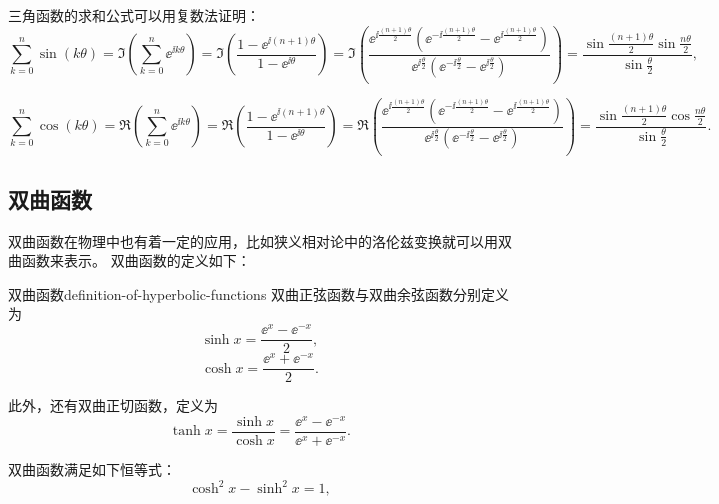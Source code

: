 三角函数的求和公式可以用复数法证明：
\begin{equation}
    \sum_{k=0}^{n} \sin (k \theta)
    = \Im \left( \sum_{k=0}^{n} \ee^{\ii k \theta} \right) = \Im \left( \frac{1 - \ee^{\ii (n+1) \theta}}{1 - \ee^{\ii \theta}} \right)
    = \Im \left( \frac{\ee^{\ii \frac{(n+1) \theta}{2}} \left( \ee^{-\ii \frac{(n+1) \theta}{2}} - \ee^{\ii \frac{(n+1) \theta}{2}} \right)}{\ee^{\ii \frac{\theta}{2}} \left( \ee^{-\ii \frac{\theta}{2}} - \ee^{\ii \frac{\theta}{2}} \right)}\right)
    = \frac{\sin \frac{(n+1) \theta}{2} \sin \frac{n \theta}{2}}{\sin \frac{\theta}{2}} ,
\end{equation}

\begin{equation}
    \sum_{k=0}^{n} \cos (k \theta)
    = \Re \left( \sum_{k=0}^{n} \ee^{\ii k \theta} \right) = \Re \left( \frac{1 - \ee^{\ii (n+1) \theta}}{1 - \ee^{\ii \theta}} \right)
    = \Re \left( \frac{\ee^{\ii \frac{(n+1) \theta}{2}} \left( \ee^{-\ii \frac{(n+1) \theta}{2}} - \ee^{\ii \frac{(n+1) \theta}{2}} \right)}{\ee^{\ii \frac{\theta}{2}} \left( \ee^{-\ii \frac{\theta}{2}} - \ee^{\ii \frac{\theta}{2}} \right)}\right)
    = \frac{\sin \frac{(n+1) \theta}{2} \cos \frac{n \theta}{2}}{\sin \frac{\theta}{2}} .
\end{equation}

\subsection{双曲函数}\label{subsec:hyperbolic-functions}
双曲函数在物理中也有着一定的应用，比如狭义相对论中的洛伦兹变换就可以用双曲函数来表示。
双曲函数的定义如下：
\begin{definition}{双曲函数}{definition-of-hyperbolic-functions}
    双曲正弦函数与双曲余弦函数分别定义为
    \begin{equation}
        \sinh x = \frac{\ee^x - \ee^{-x}}{2} ,
    \end{equation}
    \begin{equation}
        \cosh x = \frac{\ee^x + \ee^{-x}}{2} .
    \end{equation}

    此外，还有双曲正切函数，定义为
    \begin{equation}
        \tanh x = \frac{\sinh x}{\cosh x} = \frac{\ee^x - \ee^{-x}}{\ee^x + \ee^{-x}} .
    \end{equation}

\end{definition}

双曲函数满足如下恒等式：
\begin{equation}
    \cosh^2 x - \sinh^2 x = 1 ,
\end{equation}

